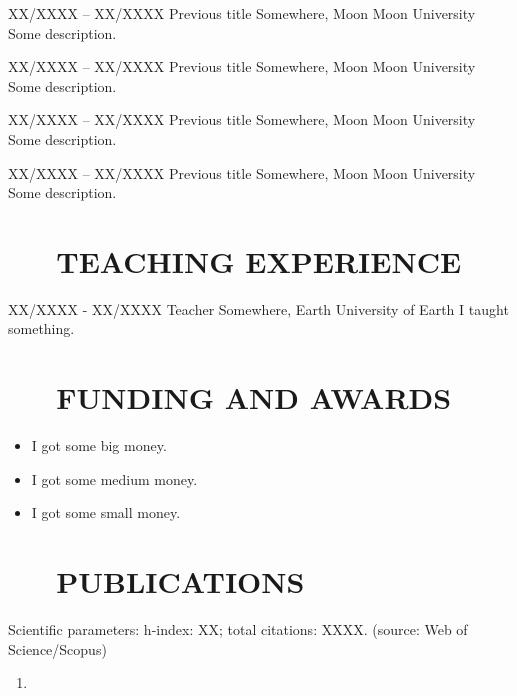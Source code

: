 \documentclass[a4paper,11pt,SidebarWidth=8.6cm]{academic_cv}
\begin{document}
\EduWorkEntry
  {XX/XXXX – XX/XXXX}
  {Previous title}
  {Somewhere, Moon}
  {Moon University}
  {Some description.}

\EduWorkEntry
  {XX/XXXX – XX/XXXX}
  {Previous title}
  {Somewhere, Moon}
  {Moon University}
  {Some description.}

\EduWorkEntry
  {XX/XXXX – XX/XXXX}
  {Previous title}
  {Somewhere, Moon}
  {Moon University}
  {Some description.}

\newpage

\EduWorkEntry
  {XX/XXXX – XX/XXXX}
  {Previous title}
  {Somewhere, Moon}
  {Moon University}
  {Some description.}

\section*{\faBuildingColumns{}~~~TEACHING EXPERIENCE}

\EduWorkEntry
  {XX/XXXX - XX/XXXX}
  {Teacher}
  {Somewhere, Earth}
  {University of Earth}
  {I taught something.}

\section*{\faTrophy{}~~~FUNDING AND AWARDS}

\begin{itemize}[leftmargin=*,itemsep=0pt,parsep=0pt]
  \item{I got some big money.} 
  \item{I got some medium money.} 
  \item{I got some small money.}
\end{itemize}

\section*{\faBookOpen{}~~~PUBLICATIONS}

Scientific parameters: h-index: XX; total citations: XXXX. (source: Web of Science/Scopus)
\begin{enumerate}[leftmargin=*,itemsep=0pt,parsep=0pt,topsep=0pt]
  \item {}
\end{enumerate}
\end{document}
